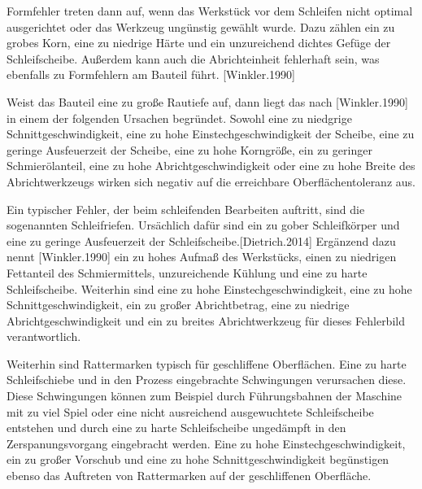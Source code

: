 Formfehler treten dann auf, wenn das Werkstück vor dem Schleifen nicht optimal ausgerichtet oder das Werkzeug ungünstig gewählt wurde. Dazu zählen ein zu grobes Korn, eine zu niedrige Härte und ein unzureichend dichtes Gefüge der Schleifscheibe. Außerdem kann auch die Abrichteinheit fehlerhaft sein, was ebenfalls zu Formfehlern am Bauteil führt. [Winkler.1990] 

Weist das Bauteil eine zu große Rautiefe auf, dann liegt das nach [Winkler.1990] in einem der folgenden Ursachen begründet. Sowohl eine zu niedgrige Schnittgeschwindigkeit, eine zu hohe Einstechgeschwindigkeit der Scheibe, eine zu geringe Ausfeuerzeit der Scheibe, eine zu hohe Korngröße, ein zu geringer Schmierölanteil, eine zu hohe Abrichtgeschwindigkeit oder eine zu hohe Breite des Abrichtwerkzeugs wirken sich negativ auf die erreichbare Oberflächentoleranz aus. 

Ein typischer Fehler, der beim schleifenden Bearbeiten auftritt, sind die sogenannten Schleifriefen. Ursächlich dafür sind ein zu gober Schleifkörper und eine zu geringe Ausfeuerzeit der Schleifscheibe.[Dietrich.2014]      
Ergänzend dazu nennt [Winkler.1990] ein zu hohes Aufmaß des Werkstücks, einen zu niedrigen Fettanteil des Schmiermittels, unzureichende Kühlung und eine zu harte Schleifscheibe. Weiterhin sind eine zu hohe Einstechgeschwindigkeit, eine zu hohe Schnittgeschwindigkeit, ein zu großer Abrichtbetrag, eine zu niedrige Abrichtgeschwindigkeit und ein zu breites Abrichtwerkzeug für dieses Fehlerbild verantwortlich.

Weiterhin sind Rattermarken typisch für geschliffene Oberflächen. Eine zu harte Schleifschiebe und in den Prozess eingebrachte Schwingungen verursachen diese. Diese Schwingungen können zum Beispiel durch Führungsbahnen der Maschine mit zu viel Spiel oder eine nicht ausreichend ausgewuchtete Schleifscheibe entstehen und durch eine zu harte Schleifscheibe ungedämpft in den Zerspanungsvorgang eingebracht werden. Eine zu hohe Einstechgeschwindigkeit, ein zu großer Vorschub und eine zu hohe Schnittgeschwindigkeit begünstigen ebenso das Auftreten von Rattermarken auf der geschliffenen Oberfläche.     





 

      





 

   
     



      







